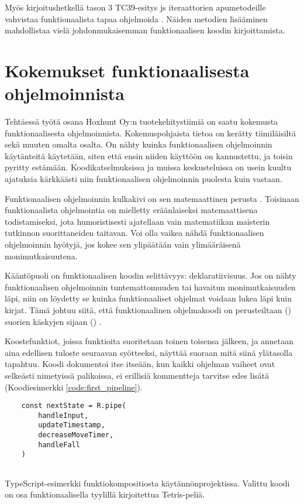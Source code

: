 Myös kirjoitushetkellä tason 3 TC39-esitys \gls{js} iteraattorien apumetodeille vahvistaa funktionaalista tapaa ohjelmoida \cite{tc39_iterator_helpers}. Näiden metodien lisääminen mahdollistaa vielä johdonmukaisemman funktionaalisen koodin kirjoittamista.

\section{Kokemukset funktionaalisesta ohjelmoinnista}


Tehtäessä työtä osana Hoxhunt Oy:n tuotekehitystiimiä on saatu kokemusta funktionaalisesta ohjelmoinnista. Kokemuspohjaista tietoa on kerätty tiimiläisiltä sekä muuten omalta osalta. On nähty kuinka funktionaalisen ohjelmoinnin käytänteitä käytetään, siten että ensin niiden käyttöön on kannustettu, ja toisin pyritty estämään. Koodikatselmuksissa ja muissa keskusteluissa on usein kuultu ajatuksia kärkkäästi niin funktionaalisen ohjelmoinnin puolesta kuin vastaan.

Funktionaalisen ohjelmoinnin kulkakivi on sen matemaattinen perusta \cite{computerphile_lambda}. Toisinaan funktionaalista ohjelmointia on mielletty eräänlaiseksi matemaattisena todistamiseksi, jota humoristisesti ajatellaan vain matematiikan maisterin tutkinnon suorittaneiden taitavan. Voi olla vaikea nähdä funktionaalisen ohjelmoinnin hyötyjä, jos kokee sen ylipäätään vain ylimääräisenä monimutkaisuutena.

Kääntöpuoli on funktionaalisen koodin selittävyys: deklaratiivisuus. Jos on nähty funktionaalisen ohjelmoinnin tuntemattomuuden tai havaitun monimutkaisuuden läpi, niin on löydetty se kuinka funktionaaliset ohjelmat voidaan lukea läpi kuin kirjat. Tämä johtuu siitä, että funktionaalinen ohjelmakoodi on perusteiltaan () suorien käskyjen sijaan () \cite{ms:fp_vs_imperative}.

Koostefunktiot, joissa funktioita suoritetaan toinen toisensa jälkeen, ja annetaan aina edellisen tuloste seuraavan syötteeksi, näyttää suoraan mitä siinä ylätasolla tapahtuu. Koodi dokumentoi itse itseään, kun kaikki ohjelman vaiheet ovat selkeästi nimetyissä palikoissa, ei erillisiä kommentteja tarvitse edes lisätä  (Koodiesimerkki \ref{code:first_pipeline}).

\begin{code}
    \begin{verbatim}
    const nextState = R.pipe(
        handleInput,
        updateTimestamp,
        decreaseMoveTimer,
        handleFall
    )
    
\end{verbatim}
    \caption{TypeScript-esimerkki funktiokompositiosta käytännönprojektissa. Valittu koodi on osa funktionaalisella tyylillä kirjoitettua Tetris-peliä.}
    \label{code:first_pipeline}
\end{code}


